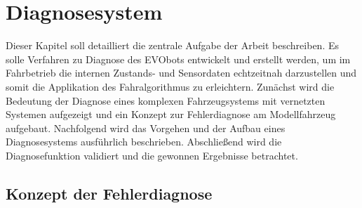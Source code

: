\chapter{Diagnosesystem} \label{cha:Diagnosesystem}

Dieser Kapitel soll detailliert die zentrale Aufgabe der Arbeit beschreiben. Es solle Verfahren zu Diagnose des EVObots entwickelt und erstellt werden, um im Fahrbetrieb die internen Zustands- und Sensordaten echtzeitnah darzustellen und somit die Applikation des Fahralgorithmus zu erleichtern. 
Zunächst wird die Bedeutung der Diagnose eines komplexen Fahrzeugsystems mit vernetzten Systemen aufgezeigt und ein Konzept zur Fehlerdiagnose am Modellfahrzeug aufgebaut. Nachfolgend wird das Vorgehen und der Aufbau eines Diagnosesystems ausführlich beschrieben. Abschließend wird die Diagnosefunktion validiert und die gewonnen Ergebnisse betrachtet. 

\section{Konzept der Fehlerdiagnose} \label{sec.KonzeptDiagnose} %

